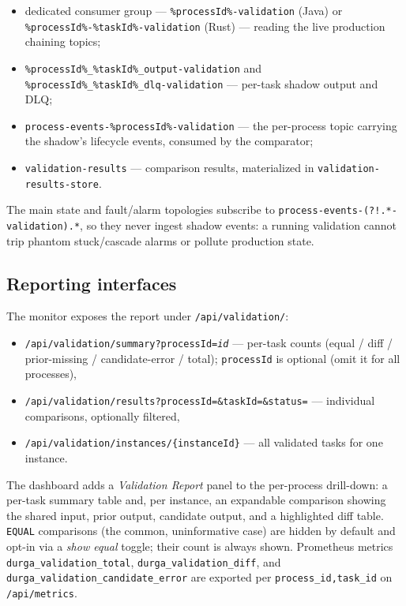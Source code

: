 \begin{itemize}
\item dedicated consumer group --- \texttt{\%processId\%-validation} (Java) or
  \texttt{\%processId\%-\%taskId\%-validation} (Rust) --- reading the live production
  chaining topics;
\item \texttt{\%processId\%\_\%taskId\%\_output-validation} and
  \texttt{\%processId\%\_\%taskId\%\_dlq-validation} --- per-task shadow output and DLQ;
\item \texttt{process-events-\%processId\%-validation} --- the per-process topic carrying the shadow's
  lifecycle events, consumed by the comparator;
\item \texttt{validation-results} --- comparison results, materialized in
  \texttt{validation-results-store}.
\end{itemize}

The main state and fault/alarm topologies subscribe to
\texttt{process-events-(?!.*-validation).*}, so they never ingest shadow events: a
running validation cannot trip phantom stuck/cascade alarms or pollute production state.

\subsection{Reporting interfaces}

The monitor exposes the report under \texttt{/api/validation/}:
\begin{itemize}
\item \texttt{/api/validation/summary?processId=\textit{id}} --- per-task counts
  (equal / diff / prior-missing / candidate-error / total); \texttt{processId} is
  optional (omit it for all processes),
\item \texttt{/api/validation/results?processId=\&taskId=\&status=} --- individual
  comparisons, optionally filtered,
\item \texttt{/api/validation/instances/\{instanceId\}} --- all validated
  tasks for one instance.
\end{itemize}

The dashboard adds a \emph{Validation Report} panel to the per-process drill-down: a
per-task summary table and, per instance, an expandable comparison showing the shared
input, prior output, candidate output, and a highlighted diff table. \texttt{EQUAL}
comparisons (the common, uninformative case) are hidden by default and opt-in via a
\emph{show equal} toggle; their count is always shown. Prometheus metrics
\texttt{durga\_validation\_total}, \texttt{durga\_validation\_diff}, and
\texttt{durga\_validation\_candidate\_error} are exported per
\texttt{process\_id,task\_id} on \\ \texttt{/api/metrics}.

